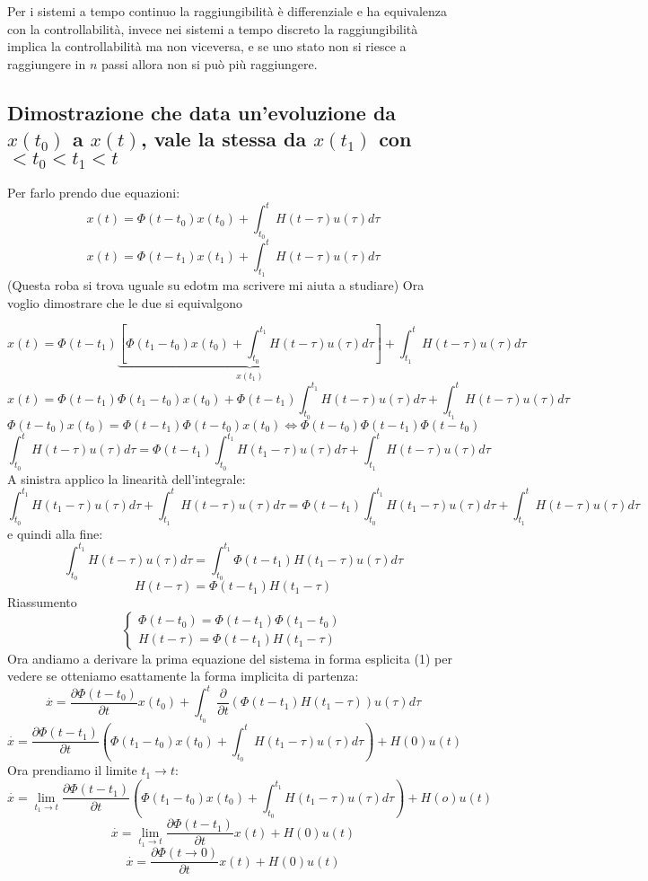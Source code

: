 \documentclass{article}
\begin{document}
Per i sistemi a tempo continuo la raggiungibilità è differenziale e ha equivalenza con la controllabilità,
invece nei sistemi a tempo discreto la raggiungibilità implica la controllabilità ma non viceversa,
e se uno stato non si riesce a raggiungere in $n$ passi allora non si può più raggiungere.


\subsection{\boldmath Dimostrazione che data un'evoluzione da $x(t_0)$ a $x(t)$, vale la stessa da $x(t_1)$ con $<t_0<t_1<t$}
Per farlo prendo due equazioni:
\begin{equation}
    x(t) = \Phi(t-t_0)x(t_0)+\int_{t_0}^{t} H(t-\tau)u(\tau)d\tau
\end{equation}
\begin{equation}
    x(t) = \Phi(t-t_1)x(t_1)+\int_{t_1}^{t} H(t-\tau)u(\tau)d\tau
\end{equation}
(Questa roba si trova uguale su edotm ma scrivere mi aiuta a studiare)
Ora voglio dimostrare che le due si equivalgono

\[ x(t) = \Phi(t-t_1)\underbrace{\left[ \Phi(t_1-t_0)x(t_0)+\int_{t_0}^{t_1} H(t-\tau)u(\tau)d\tau\right]}_{x(t_1)}+\int_{t_1}^{t} H(t-\tau)u(\tau)d\tau \]
\[x(t) = \Phi(t-t_1)\Phi(t_1-t_0)x(t_0)+\Phi(t-t_1)\int_{t_0}^{t_1} H(t-\tau)u(\tau)d\tau+\int_{t_1}^{t} H(t-\tau)u(\tau)d\tau\]
\[ \Phi(t-t_0)x(t_0)= \Phi(t-t_1)\Phi(t-t_0)x(t_0)\Longleftrightarrow\Phi(t-t_0)\Phi(t-t_1)\Phi(t-t_0) \]
\[ \int_{t_0}^{t} H(t-\tau)u(\tau)d\tau = \Phi(t-t_1)\int_{t_0}^{t_1} H(t_1-\tau)u(\tau)d\tau+\int_{t_1}^{t} H(t-\tau)u(\tau)d\tau \] 
A sinistra applico la linearità dell'integrale:
\[ \int_{t_0}^{t_1} H(t_1-\tau)u(\tau)d\tau+\int_{t_1}^{t} H(t-\tau)u(\tau)d\tau
 = \Phi(t-t_1)\int_{t_0}^{t_1} H(t_1-\tau)u(\tau)d\tau+\int_{t_1}^{t} H(t-\tau)u(\tau)d\tau \]
e quindi alla fine:
\[ \int_{t_0}^{t_1} H(t-\tau)u(\tau)d\tau = \int_{t_0}^{t_1}\Phi(t-t_1) H(t_1-\tau)u(\tau)d\tau \]
\[ H(t-\tau) = \Phi(t-t_1) H(t_1-\tau) \]
Riassumento
\[\begin{cases} 
        \Phi(t-t_0) = \Phi(t-t_1)\Phi(t_1-t_0)\\
        H(t-\tau) = \Phi(t-t_1) H(t_1-\tau)
\end{cases}
\]
Ora andiamo a derivare la prima equazione del sistema in forma esplicita (1) per vedere se otteniamo
esattamente la forma implicita di partenza:
\[ \overset{\cdot}{x} = \frac{\partial \Phi(t-t_0)}{\partial t}x(t_0)+\int_{t_0}^{t} \frac{\partial}{\partial t}\left( \Phi(t-t_1) H(t_1-\tau)\right)u(\tau)d\tau \]
\[ \overset{\cdot}{x} = \frac{\partial \Phi(t-t_1)}{\partial t}\left(\Phi(t_1-t_0)x(t_0)+\int_{t_0}^{t}H(t_1-\tau)u(\tau)d\tau\right)+H(0)u(t) \]
Ora prendiamo il limite $t_1\to t$:
\[ \overset{\cdot}{x} = \lim_{t_1\to t}\frac{\partial \Phi(t-t_1)}{\partial t}\left(\Phi(t_1-t_0)x(t_0)+\int_{t_0}^{t_1}H(t_1-\tau)u(\tau)d\tau\right)+H(o)u(t) \]
\[ \overset{\cdot}{x} = \lim_{t_1\to t}\frac{\partial \Phi(t-t_1)}{\partial t}x(t)+H(0)u(t) \]
\[ \overset{\cdot}{x} = \frac{\partial \Phi(t\to0)}{\partial t}x(t)+H(0)u(t) \]
\end{document}
